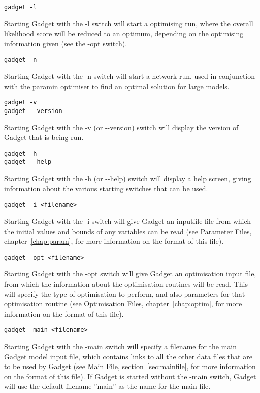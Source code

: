 \documentclass[10pt,twoside]{book}
\begin{document}
{\small\begin{verbatim}
gadget -l
\end{verbatim}}
Starting Gadget with the -l switch will start a optimising run, where the overall likelihood score will be reduced to an optimum, depending on the optimising information given (see the -opt switch).

{\small\begin{verbatim}
gadget -n
\end{verbatim}}
Starting Gadget with the -n switch will start a network run, used in conjunction with the paramin optimiser to find an optimal solution for large models.

{\small\begin{verbatim}
gadget -v
gadget --version
\end{verbatim}}
Starting Gadget with the -v (or -\hspace{0pt}-version) switch will display the version of Gadget that is being run.

{\small\begin{verbatim}
gadget -h
gadget --help
\end{verbatim}}
Starting Gadget with the -h (or -\hspace{0pt}-help) switch will display a help screen, giving information about the various starting switches that can be used.

{\small\begin{verbatim}
gadget -i <filename>
\end{verbatim}}
Starting Gadget with the -i switch will give Gadget an inputfile file from which the initial values and bounds of any variables can be read (see Parameter Files, chapter~\ref{chap:param}, for more information on the format of this file).

{\small\begin{verbatim}
gadget -opt <filename>
\end{verbatim}}
Starting Gadget with the -opt switch will give Gadget an optimisation input file, from which the information about the optimisation routines will be read.  This will specify the type of optimisation to perform, and also parameters for that optimisation routine (see Optimisation Files, chapter~\ref{chap:optim}, for more information on the format of this file).

{\small\begin{verbatim}
gadget -main <filename>
\end{verbatim}}
Starting Gadget with the -main switch will specify a filename for the main Gadget model input file, which contains links to all the other data files that are to be used by Gadget (see Main File, section~\ref{sec:mainfile}, for more information on the format of this file).  If Gadget is started without the -main switch, Gadget will use the default filename ''main'' as the name for the main file.
\end{document}
